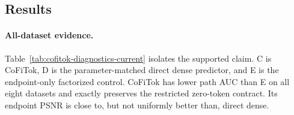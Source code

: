 \documentclass[letterpaper]{article}
\newcommand{\method}{CoFiTok}
\begin{document}
\subsection{Results}

\paragraph{All-dataset evidence.}

Table~\ref{tab:cofitok-diagnostics-current} isolates the supported claim. C is
\method{}, D is the parameter-matched direct dense predictor, and E is the
endpoint-only factorized control. \method{} has lower path AUC than E on all
eight datasets and exactly preserves the restricted zero-token contract. Its
endpoint PSNR is close to, but not uniformly better than, direct dense.

\begin{table}[t]
  \centering
  \scriptsize
  \caption{Diagnostics for the supported \method{} claim. Higher PSNR is better;
  lower path AUC and zero ratio are better.}
  \label{tab:cofitok-diagnostics-current}
\end{table}
\end{document}
